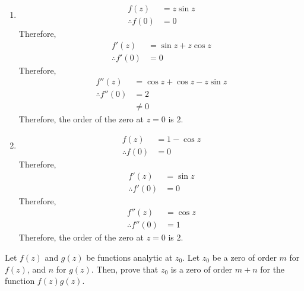 \documentclass[titlepage, fleqn, a4paper, 12pt, twoside]{article}
\theoremstyle{definition}
\theoremstyle{theorem}
\begin{document}
\begin{solution}
	\begin{enumerate}[leftmargin=*]
		\item
			\begin{align*}
				f(z)            & = z \sin z \\
				\therefore f(0) & = 0
			\end{align*}
			Therefore,
			\begin{align*}
				f'(z)            & = \sin z + z \cos z \\
				\therefore f'(0) & = 0
			\end{align*}
			Therefore,
			\begin{align*}
				f''(z)            & = \cos z + \cos z - z \sin z \\
				\therefore f''(0) & = 2                          \\
                                                  & \neq 0
			\end{align*}
			Therefore, the order of the zero at $z = 0$ is $2$.
		\item
			\begin{align*}
				f(z)            & = 1 - \cos z \\
				\therefore f(0) & = 0
			\end{align*}
			Therefore,
			\begin{align*}
				f'(z)            & = \sin z \\
				\therefore f'(0) & = 0
			\end{align*}
			Therefore,
			\begin{align*}
				f''(z)            & = \cos z \\
				\therefore f''(0) & = 1
			\end{align*}
			Therefore, the order of the zero at $z = 0$ is $2$.
	\end{enumerate}
\end{solution}

\begin{question}
	Let $f(z)$ and $g(z)$ be functions analytic at $z_0$.
	Let $z_0$ be a zero of order $m$ for $f(z)$, and $n$ for $g(z)$.
	Then, prove that $z_0$ is a zero of order $m + n$ for the function $f(z) g(z)$.
\end{question}
\end{document}
